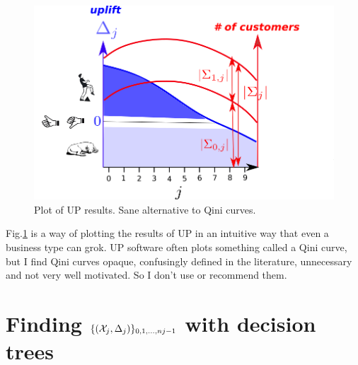 \begin{figure}[h!]
\centering
\includegraphics[width=4.5in]
{uplift/qini-fake.png}

\caption{
Plot
of UP results.
Sane alternative to Qini curves.
} 
\label{fig-qini-fake}
\end{figure}
Fig.\ref{fig-qini-fake}
is a  way of
plotting
the results 
of UP in an
intuitive
way
that even a
business type can grok.
UP software
often plots something
called a Qini
curve, 
but I find Qini
curves opaque, confusingly defined 
in the literature, unnecessary
and 
not very well motivated. So I don't
use or recommend them.




\section{Finding 
$\{({\cal X}_j, \Delta_j)\}_{0,1, \ldots, nj-1}$ with decision trees}
